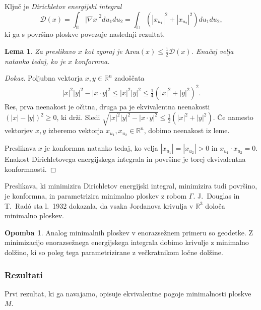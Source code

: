 \documentclass[12pt,a4paper,twoside]{article}
\theoremstyle{definition} %
\newtheorem{opomba}[definicija]{Opomba}
\newenvironment{dokaz}[1][Dokaz]{\begin{proof}[#1]}{\end{proof}}
\theoremstyle{plain} %
\newtheorem{lema}[definicija]{Lema}
\numberwithin{equation}{section}  %
\begin{document}
Ključ je \emph{Dirichletov energijski integral} 
\begin{equation} \label{eq:Dirichlet-int}
\mathcal{D}(x) = \int_{\mathbb{D}} |\nabla x|^2 du_{1}du_{2} = \int_{\mathbb{D}} (|x_{u_1}|^2 + |x_{u_2}|^2) du_{1}du_{2},
\end{equation}
ki ga s površino ploskve povezuje naslednji rezultat.

\begin{lema}
Za preslikavo $x$ kot zgoraj je $\text{Area}(x) \leq \frac{1}{2} \mathcal{D}(x)$. Enačaj velja natanko tedaj, ko je $x$ konformna.
\end{lema}

\begin{dokaz}
Poljubna vektorja $x,y \in \mathbb{R}^{n}$ zadoščata
\begin{gather*}
|x|^2 |y|^2 - |x \cdot y|^2 \leq |x|^2 |y|^2 \leq \frac{1}{4} (|x|^2 + |y|^2)^2.
\end{gather*}
Res, prva neenakost je očitna, druga pa je ekvivalentna neenakosti $(|x|-|y|)^2 \geq 0$, ki drži.
Sledi $\sqrt{|x|^2 |y|^2 - |x \cdot y|^2} \leq \frac{1}{2} (|x|^2 + |y|^2)$. Če namesto vektorjev $x,y$ izberemo vektorja $x_{u_1}, x_{u_2} \in \mathbb{R}^{n}$, dobimo neenakost iz leme.

Preslikava $x$ je konformna natanko tedaj, ko velja $|x_{u_1}| = |x_{u_2}| > 0$ in $x_{u_1} \cdot x_{u_2} = 0$. Enakost Dirichletovega energijskega integrala in površine je torej ekvivalentna konformnosti.
\end{dokaz}

Preslikava, ki minimizira Dirichletov energijski integral, minimizira tudi površino, je konformna, in parametrizira minimalno ploskev z robom $\Gamma$.
J.~Douglas in T.~Rad\'o sta l.~1932 dokazala, da vsaka Jordanova krivulja v $\mathbb{R}^3$ določa minimalno ploskev.

\begin{opomba}
Analog minimalnih ploskev v enorazsežnem primeru so geodetke. Z minimizacijo enorazsežnega energijskega integrala dobimo krivulje z minimalno dolžino, ki so poleg tega parametrizirane z večkratnikom ločne dolžine. 
\end{opomba}

\subsubsection{Rezultati}
%
Prvi rezultat, ki ga navajamo, opisuje ekvivalentne pogoje minimalnosti ploskve $M$.
\end{document}
